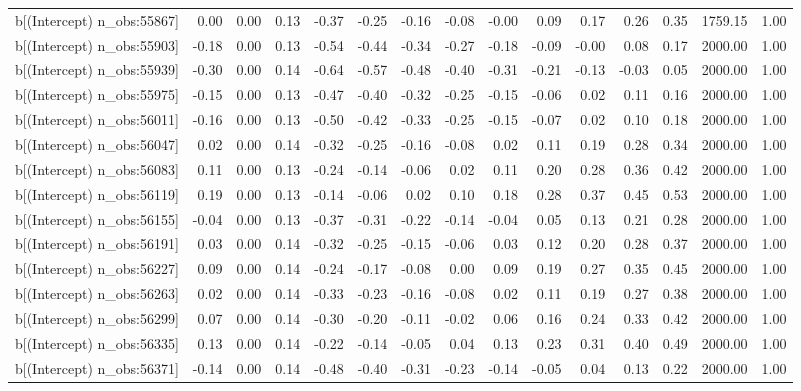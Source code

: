 \begin{table}[ht]
\begin{tabular}{rrrrrrrrrrrrrrr}
  b[(Intercept) n\_obs:55867] & 0.00 & 0.00 & 0.13 & -0.37 & -0.25 & -0.16 & -0.08 & -0.00 & 0.09 & 0.17 & 0.26 & 0.35 & 1759.15 & 1.00 \\ 
  b[(Intercept) n\_obs:55903] & -0.18 & 0.00 & 0.13 & -0.54 & -0.44 & -0.34 & -0.27 & -0.18 & -0.09 & -0.00 & 0.08 & 0.17 & 2000.00 & 1.00 \\ 
  b[(Intercept) n\_obs:55939] & -0.30 & 0.00 & 0.14 & -0.64 & -0.57 & -0.48 & -0.40 & -0.31 & -0.21 & -0.13 & -0.03 & 0.05 & 2000.00 & 1.00 \\ 
  b[(Intercept) n\_obs:55975] & -0.15 & 0.00 & 0.13 & -0.47 & -0.40 & -0.32 & -0.25 & -0.15 & -0.06 & 0.02 & 0.11 & 0.16 & 2000.00 & 1.00 \\ 
  b[(Intercept) n\_obs:56011] & -0.16 & 0.00 & 0.13 & -0.50 & -0.42 & -0.33 & -0.25 & -0.15 & -0.07 & 0.02 & 0.10 & 0.18 & 2000.00 & 1.00 \\ 
  b[(Intercept) n\_obs:56047] & 0.02 & 0.00 & 0.14 & -0.32 & -0.25 & -0.16 & -0.08 & 0.02 & 0.11 & 0.19 & 0.28 & 0.34 & 2000.00 & 1.00 \\ 
  b[(Intercept) n\_obs:56083] & 0.11 & 0.00 & 0.13 & -0.24 & -0.14 & -0.06 & 0.02 & 0.11 & 0.20 & 0.28 & 0.36 & 0.42 & 2000.00 & 1.00 \\ 
  b[(Intercept) n\_obs:56119] & 0.19 & 0.00 & 0.13 & -0.14 & -0.06 & 0.02 & 0.10 & 0.18 & 0.28 & 0.37 & 0.45 & 0.53 & 2000.00 & 1.00 \\ 
  b[(Intercept) n\_obs:56155] & -0.04 & 0.00 & 0.13 & -0.37 & -0.31 & -0.22 & -0.14 & -0.04 & 0.05 & 0.13 & 0.21 & 0.28 & 2000.00 & 1.00 \\ 
  b[(Intercept) n\_obs:56191] & 0.03 & 0.00 & 0.14 & -0.32 & -0.25 & -0.15 & -0.06 & 0.03 & 0.12 & 0.20 & 0.28 & 0.37 & 2000.00 & 1.00 \\ 
  b[(Intercept) n\_obs:56227] & 0.09 & 0.00 & 0.14 & -0.24 & -0.17 & -0.08 & 0.00 & 0.09 & 0.19 & 0.27 & 0.35 & 0.45 & 2000.00 & 1.00 \\ 
  b[(Intercept) n\_obs:56263] & 0.02 & 0.00 & 0.14 & -0.33 & -0.23 & -0.16 & -0.08 & 0.02 & 0.11 & 0.19 & 0.27 & 0.38 & 2000.00 & 1.00 \\ 
  b[(Intercept) n\_obs:56299] & 0.07 & 0.00 & 0.14 & -0.30 & -0.20 & -0.11 & -0.02 & 0.06 & 0.16 & 0.24 & 0.33 & 0.42 & 2000.00 & 1.00 \\ 
  b[(Intercept) n\_obs:56335] & 0.13 & 0.00 & 0.14 & -0.22 & -0.14 & -0.05 & 0.04 & 0.13 & 0.23 & 0.31 & 0.40 & 0.49 & 2000.00 & 1.00 \\ 
  b[(Intercept) n\_obs:56371] & -0.14 & 0.00 & 0.14 & -0.48 & -0.40 & -0.31 & -0.23 & -0.14 & -0.05 & 0.04 & 0.13 & 0.22 & 2000.00 & 1.00 \\ 

\end{tabular}
\end{table}
